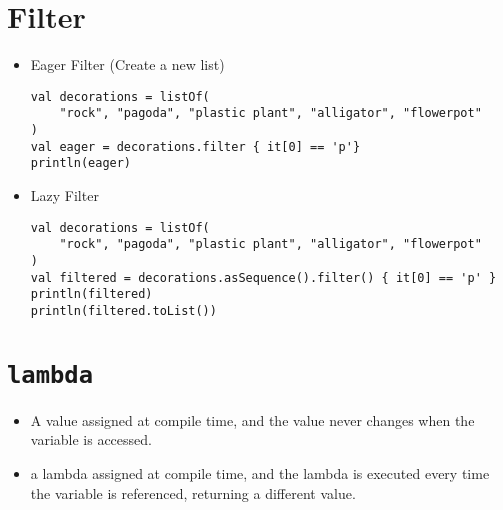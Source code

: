 \documentclass[11pt]{article}
\begin{document}
\section*{Filter}
\label{sec:orgec88113}
\begin{itemize}
\item Eager Filter (Create a new list)
\begin{verbatim}
val decorations = listOf(
    "rock", "pagoda", "plastic plant", "alligator", "flowerpot"
)
val eager = decorations.filter { it[0] == 'p'}
println(eager)
\end{verbatim}

\item Lazy Filter 
\begin{verbatim}
val decorations = listOf(
    "rock", "pagoda", "plastic plant", "alligator", "flowerpot"
)
val filtered = decorations.asSequence().filter() { it[0] == 'p' }
println(filtered)
println(filtered.toList())
\end{verbatim}
\end{itemize}
\section*{\texttt{lambda}}
\label{sec:org6514579}
\begin{itemize}
\item A value assigned at compile time, and the value never changes when
the variable is accessed.

\item a lambda assigned at compile time, and the lambda is executed
every time the variable is referenced, returning a different
value.
\end{itemize}
\end{document}
